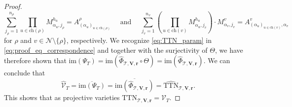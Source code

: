 \documentclass[12pt]{article}
\theoremstyle{definition}
\numberwithin{theorem}{section}
\newcommand{\V}{\mathcal{V}}
\begin{document}
\begin{proof}
\begin{equation*}
    \sum_{j_\rho=1}^{n_\rho} \prod_{u \in \mathrm{ch}(\rho)} M^{h_u}_{\alpha_u, j_\rho} =A^\rho_{(\alpha_u)_{u \in \mathrm{ch}(\rho)}} \quad \mbox{  and  } \quad
\sum_{j_v=1}^{n_v} 
\left(
\prod_{u \in \mathrm{ch}(v)} M^{h_u}_{\alpha_u, j_v} \right) \cdot M^v_{\alpha_v,j_v} = A^v_{(\alpha_u)_{u \in \mathrm{ch}(v)}, \alpha_v}
\end{equation*}
for $\rho$ and  $v \in \mathscr{N}\setminus \{\rho\}$, respectively. We recognize \eqref{eq:TTN_param} in \eqref{eq:proof_eq_correspondence} and together with the surjectivity of $\Theta$, we have therefore shown that 
$\mathrm{im}(\Psi_T) = \mathrm{im}(\widehat{\Phi}_{\mathscr{T}, \mathbf{V}, \mathbf{r}} \circ \Theta) 
    = \mathrm{im}(\widehat{\Phi}_{\mathscr{T}, \mathbf{V}, \mathbf{r}})$.
We can conclude that
\begin{equation*}
    \widehat{\mathcal{V}}_T = \overline{\mathrm{im}(\Psi_T)} = \overline{\mathrm{im}(\widehat{\Phi}_{\mathscr{T}, \mathbf{V}, \mathbf{r}})} = \widehat{\mathrm{TTN}}_{\mathscr{T}, \mathbf{V}, \mathbf{r}}.
\end{equation*}
This shows that as projective varieties $\mathrm{TTN}_{\mathscr{T}, \mathbf{V}, \mathbf{r}} = \V_T$.
\end{proof}
\end{document}
